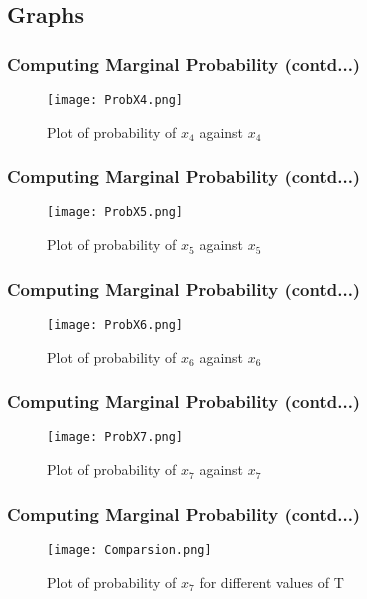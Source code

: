 \documentclass{beamer}
\begin{document}
\subsection{Graphs}
\begin{frame}
\frametitle{Computing Marginal Probability (contd...)}
\begin{flushleft}
\begin{figure}[h]
    \centering
    \texttt{[image: ProbX4.png]}
    \caption{{Plot of probability of $x_4$ against $x_4$}}
    \label{fig:plot}
\end{figure}
\end{flushleft}
\end{frame}
\begin{frame}
\frametitle{Computing Marginal Probability (contd...)}
\begin{flushleft}
\begin{figure}[h]
    \centering
    \texttt{[image: ProbX5.png]}
    \caption{{Plot of probability of $x_5$ against $x_5$}}
    \label{fig:plot}
\end{figure}
\end{flushleft}
\end{frame}
\begin{frame}
\frametitle{Computing Marginal Probability (contd...)}
\begin{flushleft}
\begin{figure}[h]
    \centering
    \texttt{[image: ProbX6.png]}
    \caption{{Plot of probability of $x_6$ against $x_6$}}
    \label{fig:plot}
\end{figure}
\end{flushleft}
\end{frame}
\begin{frame}
\frametitle{Computing Marginal Probability (contd...)}
\begin{flushleft}
\begin{figure}[h]
    \centering
    \texttt{[image: ProbX7.png]}
    \caption{{Plot of probability of $x_7$ against $x_7$}}
    \label{fig:plot}
\end{figure}
\end{flushleft}
\end{frame}
\begin{frame}
\frametitle{Computing Marginal Probability (contd...)}
\begin{flushleft}
\begin{figure}[h]
    \centering
    \texttt{[image: Comparsion.png]}
    \caption{{Plot of probability of $x_7$ for different values of T}}
    \label{fig:plot}
\end{figure}
\end{flushleft}
\end{frame}
\end{document}
